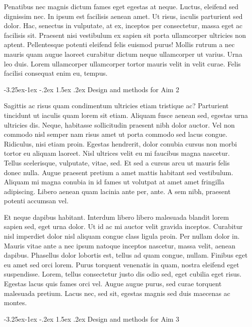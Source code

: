 \documentclass[11pt,]{article}
\makeatletter
\renewcommand\subsubsection{
  \@startsection{subsubsection}{3}{\z@}
    {-3.25ex\@plus -1ex \@minus -.2ex}
    {1.5ex \@plus .2ex}
    {\normalfont\normalsize\bf}} %
\makeatother
\begin{document}
Penatibus nec magnis dictum fames eget egestas at neque. Luctus,
eleifend sed dignissim nec. In ipsum est facilisis aenean amet. Ut
risus, iaculis parturient sed dolor. Hac, senectus in vulputate, at ex,
inceptos per consectetur, massa eget ac facilisis sit. Praesent nisi
vestibulum ex sapien sit porta ullamcorper ultricies non aptent.
Pellentesque potenti eleifend felis euismod purus! Mollis rutrum a nec
mauris quam augue laoreet curabitur dictum neque ullamcorper ut varius.
Urna leo duis. Lorem ullamcorper ullamcorper tortor mauris velit in
velit curae. Felis facilisi consequat enim eu, tempus.

\hypertarget{design-and-methods-for-aim-2}{%
\subsubsection{Design and methods for Aim
2}\label{design-and-methods-for-aim-2}}

Sagittis ac risus quam condimentum ultricies etiam tristique ac?
Parturient tincidunt ut iaculis quam lorem sit etiam. Aliquam fusce
aenean sed, egestas urna ultricies dis. Neque, habitasse sollicitudin
praesent nibh dolor auctor. Vel non commodo nisl semper nam risus amet
ut porta commodo sed lacus congue. Ridiculus, nisi etiam proin. Egestas
hendrerit, dolor conubia cursus non morbi tortor eu aliquam laoreet.
Nisl ultrices velit eu mi faucibus magna nascetur. Tellus scelerisque,
vulputate, vitae, sed. Et sed a cursus arcu ut mauris felis donec nulla.
Augue praesent pretium a amet mattis habitant sed vestibulum. Aliquam mi
magna conubia in id fames ut volutpat at amet amet fringilla adipiscing.
Libero aenean quam lacinia ante per, ante. A sem nibh, praesent potenti
accumsan vel.

Et neque dapibus habitant. Interdum libero libero malesuada blandit
lorem sapien sed, eget urna dolor. Ut id ac mi auctor velit gravida
inceptos. Curabitur nisl imperdiet dolor nisl aliquam congue class
ligula proin. Per nullam dolor in. Mauris vitae ante a nec ipsum natoque
inceptos nascetur, massa velit, aenean dapibus. Phasellus dolor lobortis
est, tellus ad quam congue, nullam. Finibus eget eu amet sed orci lorem.
Purus torquent venenatis in quam, nostra eleifend eget suspendisse.
Lorem, tellus consectetur justo dis odio sed, eget cubilia eget risus.
Egestas lacus quis fames orci vel. Augue augue purus, sed curae torquent
malesuada pretium. Lacus nec, sed sit, egestas magnis sed duis maecenas
ac montes.

\hypertarget{design-and-methods-for-aim-3}{%
\subsubsection{Design and methods for Aim
3}\label{design-and-methods-for-aim-3}}
\end{document}
